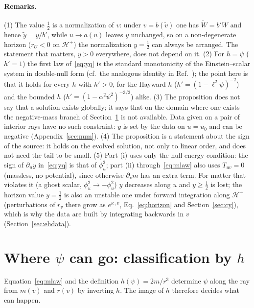 \documentclass[11pt]{article}
\begin{document}
\paragraph{Remarks.} (1) The value $\tfrac12$ is a normalization of $v$: under $v=b(\tilde v)$ one has $\tilde W=b'W$ and hence $\tilde y=y/b'$, while $u\to a(u)$ leaves $y$ unchanged, so on a non-degenerate horizon ($r_U<0$ on $\mathcal H^{+}$) the normalization $y=\tfrac12$ can always be arranged. The statement that matters, $y>0$ everywhere, does not depend on it. (2) For $h=\psi$ ($h'=1$) the first law of~\eqref{eq:yq} is the standard monotonicity of the Einstein--scalar system in double-null form (cf.\ the analogous identity in Ref.~\cite{Dafermos2005}); the point here is that it holds for every $h$ with $h'>0$, for the Hayward $h$ ($h'=(1-\ell^{2}\psi)^{-2}$) and the bounded $h$ ($h'=(1-\alpha^{2}\psi^{2})^{-3/2}$) alike. (3) The proposition does not say that a solution exists globally; it says that on the domain where one exists the negative-mass branch of Section~\ref{sec:classes} is not available. Data given on a pair of interior rays have no such constraint: $y$ is set by the data on $u=u_0$ and can be negative (Appendix~\ref{sec:num}). (4) The proposition is a statement about the sign of the source: it holds on the evolved solution, not only to linear order, and does not need the tail to be small. (5) Part (i) uses only the null energy condition: the sign of $\partial_uy$ in~\eqref{eq:yq} is that of $\phi_u^{2}$; part (ii) through~\eqref{eq:mlaw} also uses $T_{uv}=0$ (massless, no potential), since otherwise $\partial_vm$ has an extra term. For matter that violates it (a ghost scalar, $\phi_u^{2}\to-\phi_u^{2}$) $y$ decreases along $u$ and $y\ge\tfrac12$ is lost; the horizon value $y=\tfrac12$ is also an unstable one under forward integration along $\mathcal H^{+}$ (perturbations of $r_v$ there grow as $e^{\kappa_+v}$, Eq.~\eqref{eq:horizon} and Section~\ref{sec:cy}), which is why the data are built by integrating backwards in $v$ (Section~\ref{sec:ehdata}).

\section{Where \texorpdfstring{$\psi$}{psi} can go: classification by \texorpdfstring{$h$}{h}}
\label{sec:classes}

Equation~\eqref{eq:mlaw} and the definition $h(\psi)=2m/r^{3}$ determine $\psi$ along the ray from $m(v)$ and $r(v)$ by inverting $h$. The image of $h$ therefore decides what can happen.
\end{document}
